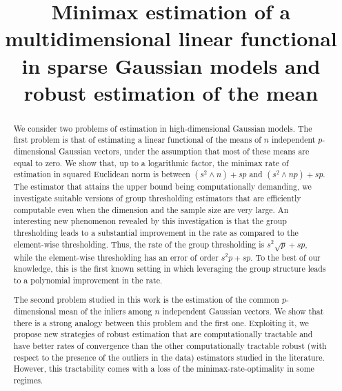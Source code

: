 \documentclass[sts,preprint,reqno,a4paper]{imsart}
\theoremstyle{plain}
\theoremstyle{remark}
\theoremstyle{definition}
\begin{document}
\begin{frontmatter}

\title{\LARGE Minimax estimation of a multidimensional linear functional in sparse Gaussian models and robust estimation of the mean}

\begin{aug}
\author{ \ead[label=e3]{}}
\author{ }



\address{Modal'X, UPL, Univ Paris Nanterre, F92000 Nanterre France
~\\ ENSAE-CREST, 5 Avenue Le Chatelier, 91120 Palaiseau, France.}
\end{aug}

\begin{abstract}
We consider two problems of estimation in high-dimensional Gaussian models.
The first problem is that of estimating a linear functional of the means of
$n$ independent  $p$-dimensional Gaussian vectors, under the assumption that
most of these means are equal to zero. We show that, up to a logarithmic
factor, the minimax rate of estimation in squared Euclidean norm is
between $(s^2\wedge n) +sp$ and $(s^2\wedge np)+sp$. The estimator that attains
the upper bound being computationally demanding, we investigate suitable
versions of group thresholding estimators that are efficiently computable even
when the dimension and the sample size are very large. An interesting new phenomenon
revealed by this investigation is that the group thresholding leads to a
substantial improvement in the rate as compared to the element-wise thresholding.
Thus, the rate of the group
thresholding is $s^2\sqrt{p}+sp$, while the element-wise thresholding has an
error of order $s^2p+sp$. To the best of our knowledge, this is the first known setting in which leveraging the group structure leads to a polynomial
improvement in the rate.

The second problem studied in this work is the estimation of the common
$p$-dimensional mean of the inliers among $n$ independent Gaussian vectors.
We show that there is a strong analogy between this problem and the first one.
Exploiting it, we propose new strategies of robust estimation that are computationally tractable and have better rates of convergence than the other
computationally tractable robust (with respect to the presence of the
outliers in the data) estimators studied in the literature. However, this tractability comes with a loss of the minimax-rate-optimality in some regimes.


\end{abstract}
\end{frontmatter}
\end{document}
